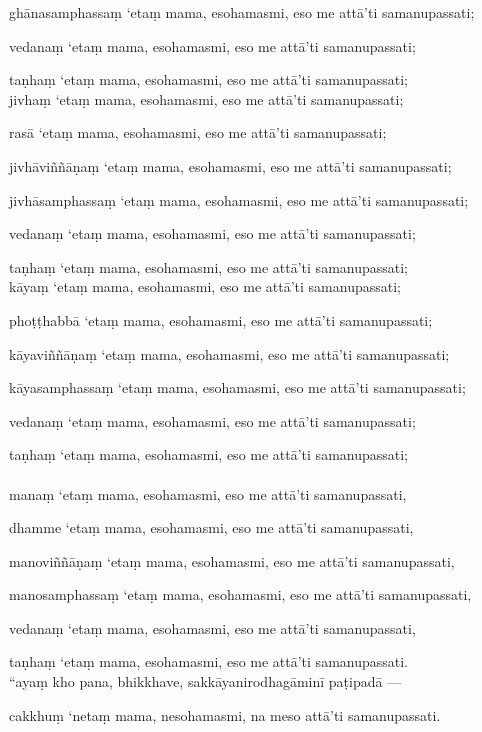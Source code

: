 \documentclass[11pt]{article}
\begin{document}
ghānasamphassaṃ ‘etaṃ mama, esohamasmi, eso me attā’ti samanupassati;\

vedanaṃ ‘etaṃ mama, esohamasmi, eso me attā’ti samanupassati;\

taṇhaṃ ‘etaṃ mama, esohamasmi, eso me attā’ti samanupassati;\\

jivhaṃ ‘etaṃ mama, esohamasmi, eso me attā’ti samanupassati;\

rasā ‘etaṃ mama, esohamasmi, eso me attā’ti samanupassati;\

jivhāviññāṇaṃ ‘etaṃ mama, esohamasmi, eso me attā’ti samanupassati;\

jivhāsamphassaṃ ‘etaṃ mama, esohamasmi, eso me attā’ti samanupassati;\

vedanaṃ ‘etaṃ mama, esohamasmi, eso me attā’ti samanupassati;\

taṇhaṃ ‘etaṃ mama, esohamasmi, eso me attā’ti samanupassati;\\

kāyaṃ ‘etaṃ mama, esohamasmi, eso me attā’ti samanupassati;\

phoṭṭhabbā ‘etaṃ mama, esohamasmi, eso me attā’ti samanupassati;\

kāyaviññāṇaṃ ‘etaṃ mama, esohamasmi, eso me attā’ti samanupassati;\

kāyasamphassaṃ ‘etaṃ mama, esohamasmi, eso me attā’ti samanupassati;\

vedanaṃ ‘etaṃ mama, esohamasmi, eso me attā’ti samanupassati;\

taṇhaṃ ‘etaṃ mama, esohamasmi, eso me attā’ti samanupassati;\\
\pagebreak\\

manaṃ ‘etaṃ mama, esohamasmi, eso me attā’ti samanupassati,\

dhamme ‘etaṃ mama, esohamasmi, eso me attā’ti samanupassati,\

manoviññāṇaṃ ‘etaṃ mama, esohamasmi, eso me attā’ti samanupassati,\

manosamphassaṃ ‘etaṃ mama, esohamasmi, eso me attā’ti samanupassati,\

vedanaṃ ‘etaṃ mama, esohamasmi, eso me attā’ti samanupassati,\

taṇhaṃ ‘etaṃ mama, esohamasmi, eso me attā’ti samanupassati.\\

“ayaṃ kho pana, bhikkhave, sakkāyanirodhagāminī paṭipadā — 

cakkhuṃ ‘netaṃ mama, nesohamasmi, na meso attā’ti samanupassati.\
\end{document}

